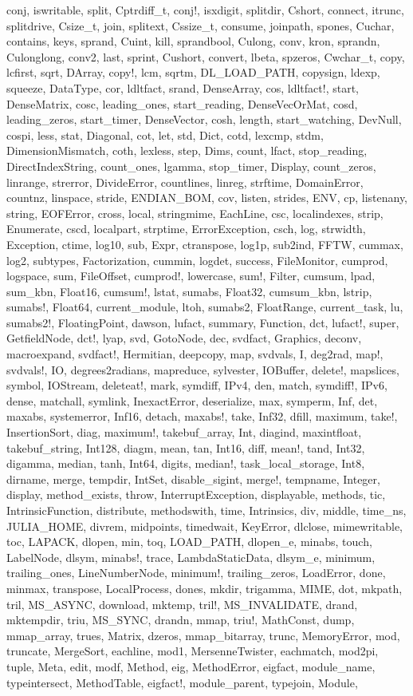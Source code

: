 conj, iswritable, split, Cptrdiff_t, conj!, isxdigit, splitdir, Cshort, connect, itrunc, splitdrive, Csize_t, join, splitext, Cssize_t, consume, joinpath, spones, Cuchar, contains, keys, sprand, Cuint, kill, sprandbool, Culong, conv, kron, sprandn, Culonglong, conv2, last, sprint, Cushort, convert, lbeta, spzeros, Cwchar_t, copy, lcfirst, sqrt, DArray, copy!, lcm, sqrtm, DL_LOAD_PATH, copysign, ldexp, squeeze, DataType, cor, ldltfact, srand, DenseArray, cos, ldltfact!, start, DenseMatrix, cosc, leading_ones, start_reading, DenseVecOrMat, cosd, leading_zeros, start_timer, DenseVector, cosh, length, start_watching, DevNull, cospi, less, stat, Diagonal, cot, let, std, Dict, cotd, lexcmp, stdm, DimensionMismatch, coth, lexless, step, Dims, count, lfact, stop_reading, DirectIndexString, count_ones, lgamma, stop_timer, Display, count_zeros, linrange, strerror, DivideError, countlines, linreg, strftime, DomainError, countnz, linspace, stride, ENDIAN_BOM, cov, listen, strides, ENV, cp, listenany, string, EOFError, cross, local, stringmime, EachLine, csc, localindexes, strip, Enumerate, cscd, localpart, strptime, ErrorException, csch, log, strwidth, Exception, ctime, log10, sub, Expr, ctranspose, log1p, sub2ind, FFTW, cummax, log2, subtypes, Factorization, cummin, logdet, success, FileMonitor, cumprod, logspace, sum, FileOffset, cumprod!, lowercase, sum!, Filter, cumsum, lpad, sum_kbn, Float16, cumsum!, lstat, sumabs, Float32, cumsum_kbn, lstrip, sumabs!, Float64, current_module, ltoh, sumabs2, FloatRange, current_task, lu, sumabs2!, FloatingPoint, dawson, lufact, summary, Function, dct, lufact!, super, GetfieldNode, dct!, lyap, svd, GotoNode, dec, svdfact, Graphics, deconv, macroexpand, svdfact!, Hermitian, deepcopy, map, svdvals, I, deg2rad, map!, svdvals!, IO, degrees2radians, mapreduce, sylvester, IOBuffer, delete!, mapslices, symbol, IOStream, deleteat!, mark, symdiff, IPv4, den, match, symdiff!, IPv6, dense, matchall, symlink, InexactError, deserialize, max, symperm, Inf, det, maxabs, systemerror, Inf16, detach, maxabs!, take, Inf32, dfill, maximum, take!, InsertionSort, diag, maximum!, takebuf_array, Int, diagind, maxintfloat, takebuf_string, Int128, diagm, mean, tan, Int16, diff, mean!, tand, Int32, digamma, median, tanh, Int64, digits, median!, task_local_storage, Int8, dirname, merge, tempdir, IntSet, disable_sigint, merge!, tempname, Integer, display, method_exists, throw, InterruptException, displayable, methods, tic, IntrinsicFunction, distribute, methodswith, time, Intrinsics, div, middle, time_ns, JULIA_HOME, divrem, midpoints, timedwait, KeyError, dlclose, mimewritable, toc, LAPACK, dlopen, min, toq, LOAD_PATH, dlopen_e, minabs, touch, LabelNode, dlsym, minabs!, trace, LambdaStaticData, dlsym_e, minimum, trailing_ones, LineNumberNode, minimum!, trailing_zeros, LoadError, done, minmax, transpose, LocalProcess, dones, mkdir, trigamma, MIME, dot, mkpath, tril, MS_ASYNC, download, mktemp, tril!, MS_INVALIDATE, drand, mktempdir, triu, MS_SYNC, drandn, mmap, triu!, MathConst, dump, mmap_array, trues, Matrix, dzeros, mmap_bitarray, trunc, MemoryError, mod, truncate, MergeSort, eachline, mod1, MersenneTwister, eachmatch, mod2pi, tuple, Meta, edit, modf, Method, eig, MethodError, eigfact, module_name, typeintersect, MethodTable, eigfact!, module_parent, typejoin, Module, 